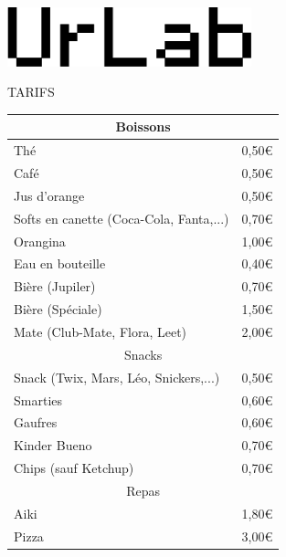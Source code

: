 \documentclass[a4paper, 12pt]{report}
\begin{document}
    
\begin{center}\includegraphics[width=200pt]{./logo.png}

\Huge TARIFS
\end{center}
\begin{center}
\begin{tabular}{|l|l|}
  \hline

  \multicolumn{2}{|c|}{\Large Boissons} \\


  \hline
  \large Thé & 0,50\euro \\
  \large Café & 0,50\euro\\
  \large Jus d'orange & 0,50\euro\\
  \large Softs en canette (Coca-Cola, Fanta,...) & 0,70\euro\\
  \large Orangina & 1,00\euro\\
  \large Eau en bouteille & 0,40\euro\\
  \large Bière (Jupiler) & 0,70\euro\\
  \large Bière (Spéciale) & 1,50\euro\\
  \large Mate (Club-Mate, Flora, Leet) & 2,00\euro\\
  \hline

  \multicolumn{2}{|c|}{\Large Snacks} \\
  \hline
  \large Snack (Twix, Mars, Léo, Snickers,...) & 0,50\euro\\
  \large Smarties & 0,60\euro\\
  \large Gaufres & 0,60\euro\\
  \large Kinder Bueno & 0,70\euro\\
  \large Chips (sauf Ketchup) & 0,70\euro\\
  \hline

  \multicolumn{2}{|c|}{\Large Repas} \\
  \hline
  \large Aiki & 1,80\euro\\
  \large Pizza & 3,00\euro\\
  \hline
\end{tabular}
\end{center}
\end{document}

